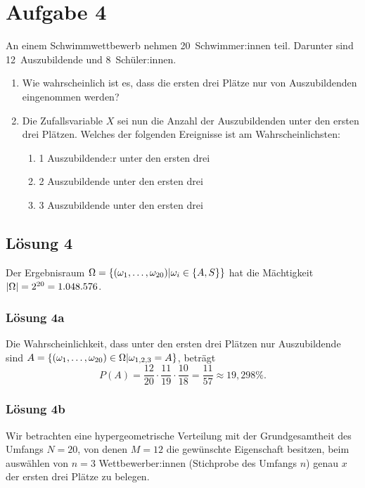 \documentclass[main.tex]{subfiles}
\begin{document}
\section{Aufgabe 4}
An einem Schwimmwettbewerb nehmen 20~Schwimmer:innen teil. Darunter sind 12~Auszubildende und 8~Schüler:innen.
\begin{enumerate}
    \item Wie wahrscheinlich ist es, dass die ersten drei Plätze nur von Auszubildenden eingenommen werden?
    \item Die Zufallsvariable $X$ sei nun die \glqq Anzahl der Auszubildenden unter den ersten drei Plätzen\grqq. Welches der folgenden Ereignisse ist am Wahrscheinlichsten:
    \begin{enumerate}
        \item 1 Auszubildende:r unter den ersten drei
        \item 2 Auszubildende unter den ersten drei
        \item 3 Auszubildende unter den ersten drei
    \end{enumerate}
\end{enumerate}

\subsection{Lösung 4}

Der Ergebnisraum $\Omega = \set*{(\omega_1, \ldots, \omega_{20})\middle| \omega_i \in \set*{A, S} }$ hat die Mächtigkeit $\abs*{\Omega} = 2^{20} = 1.048.576$.

\subsubsection{Lösung 4a}
Die Wahrscheinlichkeit, dass unter den ersten drei Plätzen nur Auszubildende sind $A=\set*{(\omega_1, \ldots, \omega_{20}) \in \Omega \middle|\omega_{1,2,3} = A}$, beträgt
\begin{equation*}
    P(A) = \frac{12}{20} \cdot \frac{11}{19} \cdot \frac{10}{18} = \frac{11}{57} \approx 19,298\%.
\end{equation*}

\subsubsection{Lösung 4b}
Wir betrachten eine hypergeometrische Verteilung mit der Grundgesamtheit des Umfangs $N=20$, von denen $M=12$ die gewünschte Eigenschaft besitzen, beim auswählen von $n=3$ Wettbewerber:innen (Stichprobe des Umfangs $n$) genau $x$ der ersten drei Plätze zu belegen.
\end{document}
